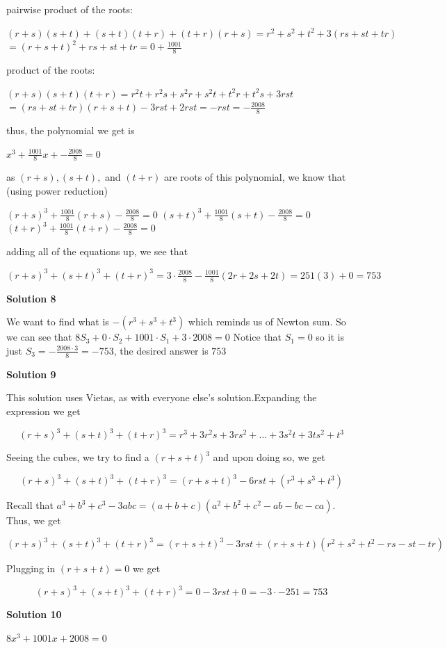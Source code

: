 \begin{enumerate}
 pairwise product of the roots:

 $(r+s)(s+t)+(s+t)(t+r)+(t+r)(r+s)=r^2+s^2+t^2+3(rs+st+tr)$
$=(r+s+t)^2+rs+st+tr=0+\frac{1001}{8}$

 product of the roots:

 $(r+s)(s+t)(t+r)=r^2t+r^2s+s^2r+s^2t+t^2r+t^2s+3rst$
$=(rs+st+tr)(r+s+t)-3rst+2rst=-rst=-\frac{2008}{8}$

 thus, the polynomial we get is

 $x^3+\frac{1001}{8}x+-\frac{2008}{8}=0$

 as $(r+s), (s+t),$ and $(t+r)$ are roots of this polynomial, we know that (using power reduction)

 $(r+s)^3+\frac{1001}{8}(r+s)-\frac{2008}{8}=0$
$(s+t)^3+\frac{1001}{8}(s+t)-\frac{2008}{8}=0$
$(t+r)^3+\frac{1001}{8}(t+r)-\frac{2008}{8}=0$

 adding all of the equations up, we see that

 $(r+s)^3+(s+t)^3+(t+r)^3=3\cdot\frac{2008}{8}-\frac{1001}{8}(2r+2s+2t)=251(3)+0=\boxed{753}$




\textbf{Solution 8}

We want to find what is $-(r^3+s^3+t^3)$ which reminds us of Newton sum. So we can see that $8S_3+0\cdot S_2+1001\cdot S_1+3\cdot 2008=0$ Notice that $S_1=0$ so it is just $S_3=-\frac{2008\cdot 3}{8}=-753$, the desired answer is $\boxed{753}$




\textbf{Solution 9}

This solution uses Vietas, as with everyone else's solution.Expanding the expression we get

 
 \[(r+s)^3+(s+t)^3+(t+r)^3 = r^3+3r^2s+3rs^2+\dots +3s^2t+3ts^2+t^3\]

 Seeing the cubes, we try to find a $(r+s+t)^3$ and upon doing so, we get

 
 \[(r+s)^3+(s+t)^3+(t+r)^3=(r+s+t)^3-6rst+(r^3+s^3+t^3)\]

 Recall that $a^3+b^3+c^3-3abc=(a+b+c)(a^2+b^2+c^2-ab-bc-ca)$. Thus, we get

 
 \[(r+s)^3+(s+t)^3+(t+r)^3=(r+s+t)^3-3rst+(r+s+t)(r^2+s^2+t^2-rs-st-tr)\]

 Plugging in $(r+s+t)=0$ we get

 
 \[(r+s)^3+(s+t)^3+(t+r)^3=0-3rst+0=-3\cdot -251=\boxed{753}\]




\textbf{Solution 10}

$8x^3+1001x+2008=0$


\end{enumerate}
